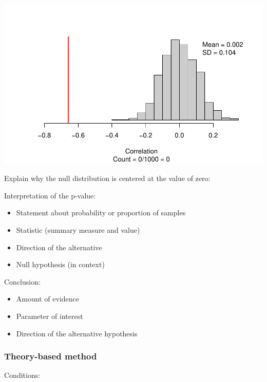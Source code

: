 \documentclass[
]{report}
\begin{document}
\begin{center}\includegraphics[width=0.7\linewidth]{13-LN013-regression_files/figure-latex/unnamed-chunk-6-1} \end{center}

Explain why the null distribution is centered at the value of zero:

\vspace{0.5in}
\newpage

Interpretation of the p-value:

\begin{itemize}
\item
  Statement about probability or proportion of samples
\item
  Statistic (summary measure and value)
\item
  Direction of the alternative
\item
  Null hypothesis (in context)
\end{itemize}

\vspace{0.8in}

Conclusion:

\begin{itemize}
\item
  Amount of evidence
\item
  Parameter of interest
\item
  Direction of the alternative hypothesis
\end{itemize}

\vspace{0.6in}

\hypertarget{theory-based-method-6}{%
\subsubsection*{Theory-based method}\label{theory-based-method-6}}

Conditions:
\end{document}
